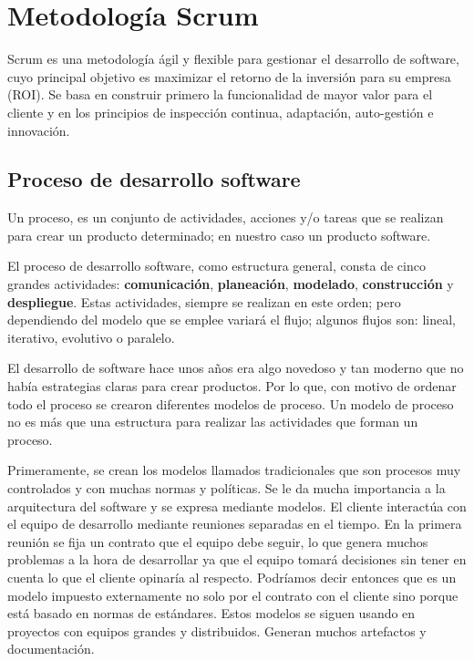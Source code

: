 \section{Metodología Scrum}
	Scrum es una metodología ágil y flexible para gestionar el desarrollo de software, cuyo principal objetivo es maximizar el retorno de la inversión para su empresa (ROI). Se basa en construir primero la funcionalidad de mayor valor para el cliente y en los principios de inspección continua, adaptación, auto-gestión e innovación.
	
\label{cap2:sec:scrum}

	\subsection{Proceso de desarrollo software}
	\label{cap2:subsec:proceso desarrollo software}
	Un proceso, es un conjunto de actividades, acciones y/o tareas que se realizan para crear un producto determinado; en nuestro caso un producto software.
	
	El proceso de desarrollo software, como estructura general, consta de cinco grandes actividades: \textbf{comunicación}, \textbf{planeación}, \textbf{modelado}, \textbf{construcción} y \textbf{despliegue}. Estas actividades, siempre se realizan en este orden; pero dependiendo del modelo que se emplee variará el flujo; algunos flujos son: lineal, iterativo, evolutivo o paralelo.
	
	El desarrollo de software hace unos años era algo novedoso y tan moderno que no había estrategias claras para crear productos. Por lo que, con motivo de ordenar todo el proceso se crearon diferentes modelos de proceso. Un modelo de proceso no es más que una estructura para realizar las actividades que forman un proceso.
	
	Primeramente, se crean los modelos llamados tradicionales que son procesos muy controlados y con muchas normas y políticas. Se le da mucha importancia a la arquitectura del software y se expresa mediante modelos. El cliente interactúa con el equipo de desarrollo mediante reuniones separadas en el tiempo. En la primera reunión se fija un contrato que el equipo debe seguir, lo que genera muchos problemas a la hora de desarrollar ya que el equipo tomará decisiones sin tener en cuenta lo que el cliente opinaría al respecto. Podríamos decir entonces que es un modelo impuesto externamente no solo por el contrato con el cliente sino porque está basado en normas de estándares. 
	Estos modelos se siguen usando en proyectos con equipos grandes y distribuidos. Generan muchos artefactos y documentación.
	
